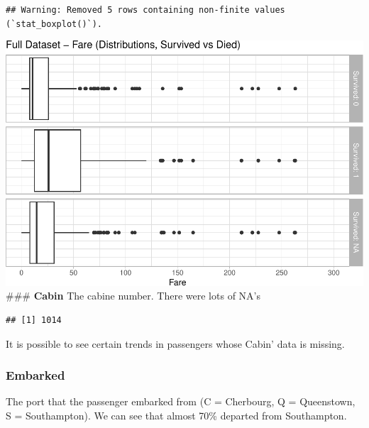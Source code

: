 \documentclass[
]{article}
\newenvironment{Shaded}{\begin{snugshade}}{\end{snugshade}}
\newcommand{\FunctionTok}[1]{\textcolor[rgb]{0.00,0.00,0.00}{#1}}
\newcommand{\NormalTok}[1]{#1}
\newcommand{\SpecialCharTok}[1]{\textcolor[rgb]{0.00,0.00,0.00}{#1}}
\newcommand{\StringTok}[1]{\textcolor[rgb]{0.31,0.60,0.02}{#1}}
\begin{document}
\begin{verbatim}
## Warning: Removed 5 rows containing non-finite values (`stat_boxplot()`).
\end{verbatim}

\includegraphics{final_pdf_files/figure-latex/unnamed-chunk-21-1.pdf}
\#\#\# \textbf{Cabin} The cabine number. There were lots of NA's

\begin{Shaded}
\end{Shaded}

\begin{verbatim}
## [1] 1014
\end{verbatim}

It is possible to see certain trends in passengers whose Cabin' data is
missing.

\hypertarget{embarked}{%
\subsubsection{\texorpdfstring{\textbf{Embarked}}{Embarked}}\label{embarked}}

The port that the passenger embarked from (C = Cherbourg, Q =
Queenstown, S = Southampton). We can see that almost 70\% departed from
Southampton.
\end{document}
